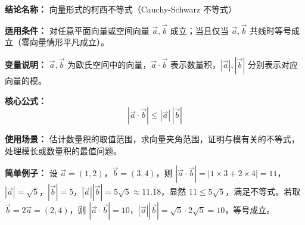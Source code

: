 \textbf{结论名称：} 向量形式的柯西不等式（Cauchy-Schwarz 不等式）

\textbf{适用条件：} 对任意平面向量或空间向量 \(\vec{a},\vec{b}\) 成立；当且仅当 \(\vec{a},\vec{b}\) 共线时等号成立（零向量情形平凡成立）。

\textbf{变量说明：} \(\vec{a},\vec{b}\) 为欧氏空间中的向量，\(\vec{a}\cdot\vec{b}\) 表示数量积，\(|\vec{a}|,|\vec{b}|\) 分别表示对应向量的模。

\textbf{核心公式：}
\[
\boxed{\left|\vec{a}\cdot\vec{b}\right| \le |\vec{a}|\,|\vec{b}|}
\]

\textbf{使用场景：} 估计数量积的取值范围，求向量夹角范围，证明与模有关的不等式，处理模长或数量积的最值问题。

\textbf{简单例子：} 设 \(\vec{a}=(1,2)\)，\(\vec{b}=(3,4)\)，则 \(|\vec{a}\cdot\vec{b}|=|1\times3+2\times4|=11\)，\(|\vec{a}|=\sqrt{5}\)，\(|\vec{b}|=5\)，\(|\vec{a}||\vec{b}|=5\sqrt{5}\approx11.18\)，显然 \(11\le5\sqrt{5}\)，满足不等式。若取 \(\vec{b}=2\vec{a}=(2,4)\)，则 \(|\vec{a}\cdot\vec{b}|=10\)，\(|\vec{a}||\vec{b}|=\sqrt{5}\cdot2\sqrt{5}=10\)，等号成立。